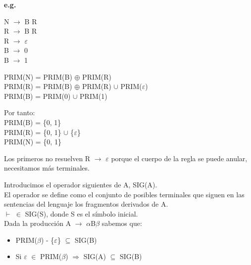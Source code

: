 \documentclass[\main/ApuntesPL.tex]{subfiles}
\begin{document}
    \bigskip
    \par
    \textbf{e.g.}\\
    \begin{center}
      \begin{minipage}{.3\textwidth}
        \hspace*{5mm}N $\rightarrow$ B R\\
        \hspace*{5mm}R $\rightarrow$ B R\\
        \hspace*{5mm}R $\rightarrow$ $\varepsilon$\\
        \hspace*{5mm}B $\rightarrow$ 0\\
        \hspace*{5mm}B $\rightarrow$ 1
      \end{minipage}%
      \begin{minipage}{.7\textwidth}
        \par
        PRIM(N) = PRIM(B) $\oplus$ PRIM(R)\\
        PRIM(R) = PRIM(B) $\oplus$ PRIM(R) $\cup$ PRIM($\varepsilon$)\\
        PRIM(B) = PRIM(0) $\cup$ PRIM(1)

        \bigskip
        \par
        Por tanto:\\
        PRIM(B) = \{0, 1\}\\
        PRIM(R) = \{0, 1\} $\cup$ \{$\varepsilon$\}\\
        PRIM(N) = \{0, 1\}
      \end{minipage}
    \end{center}

    \bigskip
    \par
    Los primeros no resuelven R $\rightarrow$ $\varepsilon$ porque el cuerpo de la regla se puede
    anular, necesitamos más terminales.

    \bigskip
    \par
    Introducimos el operador siguientes de A, {\large SIG(A)}.\\
    El operador se define como el conjunto de posibles terminales que siguen en las sentencias del
    lenguaje los fragmentos derivados de A.\\
    \vspace{2mm}
    $\vdash$ $\in$ SIG(S), donde S es el símbolo inicial.\\
    Dada la producción A $\rightarrow$ $\alpha$B$\beta$ sabemos que:
    \begin{itemize}
      \item PRIM($\beta$) - \{$\varepsilon$\} $\subseteq$ SIG(B)
      \item Si $\varepsilon$ $\in$ PRIM($\beta$) $\Rightarrow$ SIG(A) $\subseteq$ SIG(B)
    \end{itemize}
\end{document}
